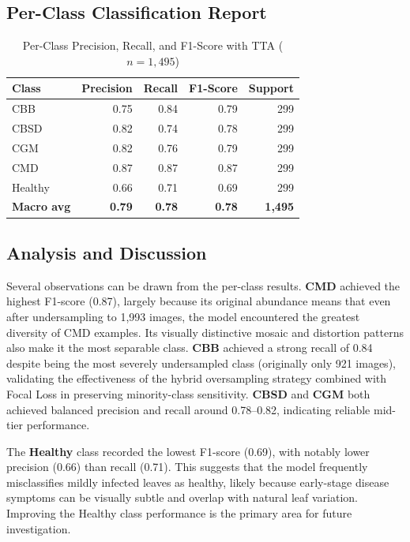 \documentclass[12pt,a4paper]{article}
\begin{document}
\subsection{Per-Class Classification Report}

\begin{table}[H]
\centering
\caption{Per-Class Precision, Recall, and F1-Score with TTA ($n=1{,}495$)}
\label{tab:classreport}
\begin{tabular}{|l|r|r|r|r|}
    \hline
    \textbf{Class} & \textbf{Precision} & \textbf{Recall} & \textbf{F1-Score} & \textbf{Support} \\
    \hline
    CBB     & 0.75 & 0.84 & 0.79 & 299 \\
    \hline
    CBSD    & 0.82 & 0.74 & 0.78 & 299 \\
    \hline
    CGM     & 0.82 & 0.76 & 0.79 & 299 \\
    \hline
    CMD     & 0.87 & 0.87 & 0.87 & 299 \\
    \hline
    Healthy & 0.66 & 0.71 & 0.69 & 299 \\
    \hline
    \textbf{Macro avg} & \textbf{0.79} & \textbf{0.78} & \textbf{0.78} & \textbf{1,495} \\
    \hline
\end{tabular}
\end{table}

\subsection{Analysis and Discussion}

Several observations can be drawn from the per-class results. \textbf{CMD} achieved the highest F1-score (0.87), largely because its original abundance means that even after undersampling to 1,993 images, the model encountered the greatest diversity of CMD examples. Its visually distinctive mosaic and distortion patterns also make it the most separable class. \textbf{CBB} achieved a strong recall of 0.84 despite being the most severely undersampled class (originally only 921 images), validating the effectiveness of the hybrid oversampling strategy combined with Focal Loss in preserving minority-class sensitivity. \textbf{CBSD} and \textbf{CGM} both achieved balanced precision and recall around 0.78--0.82, indicating reliable mid-tier performance.

The \textbf{Healthy} class recorded the lowest F1-score (0.69), with notably lower precision (0.66) than recall (0.71). This suggests that the model frequently misclassifies mildly infected leaves as healthy, likely because early-stage disease symptoms can be visually subtle and overlap with natural leaf variation. Improving the Healthy class performance is the primary area for future investigation.
\end{document}
